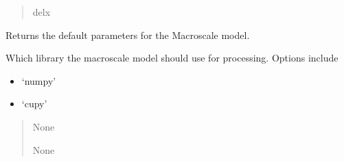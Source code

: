 \documentclass[letterpaper,10pt,english]{sphinxmanual}
\begin{document}
\begin{fulllineitems}
\begin{fulllineitems}
\begin{quote}
\begin{description}
\sphinxAtStartPar
delx

\end{description}\end{quote}

\end{fulllineitems}


\begin{fulllineitems}
\label{\detokenize{lysis.util:lysis.util.parameters.MacroParameters.print_default_values}}
\pysigstartsignatures
{}
\pysigstopsignatures
\sphinxAtStartPar
Returns the default parameters for the Macroscale model.

\end{fulllineitems}


\begin{fulllineitems}
\label{\detokenize{lysis.util:lysis.util.parameters.MacroParameters.processing_library}}
\pysigstartsignatures
{}
\pysigstopsignatures
\sphinxAtStartPar
Which library the macroscale model should use for processing.
Options include
\begin{itemize}
\item {} 
\sphinxAtStartPar
‘numpy’

\item {} 
\sphinxAtStartPar
‘cupy’

\end{itemize}
\begin{quote}\begin{description}
\sphinxAtStartPar
None

\sphinxAtStartPar
None

\end{description}\end{quote}


\end{fulllineitems}
\end{fulllineitems}
\end{document}
